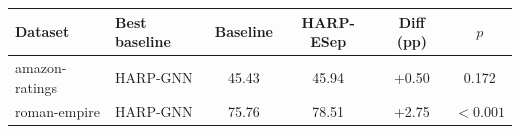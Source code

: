 \begin{tabular}{llcccc}
\toprule
Dataset & Best baseline & Baseline & HARP-ESep & Diff (pp) & $p$ \\
\midrule
amazon-ratings & HARP-GNN & 45.43 & 45.94 & +0.50 & 0.172 \\
roman-empire & HARP-GNN & 75.76 & 78.51 & +2.75 & $<0.001$ \\
\bottomrule
\end{tabular}
